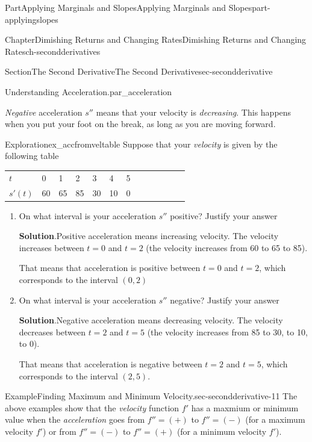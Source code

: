 \documentclass{tufte-book}
\newcommand{\blocktitlefont}{\relax}
\newcommand{\tabularfont}{\relax}
\numberwithin{equation}{chapter}
\newcommand{\hrulemedium}{\noalign{\hrule height 0.07em}}
\begin{document}
\begin{partptx}{Part}{Applying Marginals and Slopes}{}{Applying Marginals and Slopes}{}{}{part-applyingslopes}
\begin{chapterptx}{Chapter}{Dimishing Returns and Changing Rates}{}{Dimishing Returns and Changing Rates}{}{}{ch-secondderivatives}
\begin{sectionptx}{Section}{The Second Derivative}{}{The Second Derivative}{}{}{sec-secondderivative}
\begin{paragraphs}{Understanding Acceleration.}{par_acceleration}
\par
\emph{Negative} acceleration \(s''\) means that your velocity is \emph{decreasing}.  This happens when you put your foot on the break, as long as you are moving forward.%
\end{paragraphs}%
\begin{exploration}{Exploration}{}{ex_accfromveltable}%
Suppose that your \emph{velocity} is given by the following table \begin{center}%
{\tabularfont%
\begin{tabular}{lBlBlBlBlBlBl}
\(t\)&0&1&2&3&4&5\tabularnewline\hrulemedium
\(s'(t)\)&60&65&85&30&10&0
\end{tabular}
}%
\end{center}%
%
\begin{enumerate}[font=\bfseries,label=(\alph*),ref=\alph*]%
\item{}On what interval is your acceleration \(s''\) positive? Justify your answer%
\par\smallskip%
\noindent\textbf{\blocktitlefont Solution}.\hypertarget{ex_accfromveltable-2-2}{}\quad{}Positive acceleration means increasing velocity. The velocity increases between \(t=0\) and \(t=2\) (the velocity increases from 60 to 65 to 85).%
\par
That means that acceleration is positive between \(t=0\) and \(t=2\), which corresponds to the interval \((0,2)\)%
\item{}On what interval is your acceleration \(s''\) negative? Justify your answer%
\par\smallskip%
\noindent\textbf{\blocktitlefont Solution}.\hypertarget{ex_accfromveltable-3-2}{}\quad{}Negative acceleration means decreasing velocity. The velocity decreases between \(t=2\) and \(t=5\) (the velocity increases from 85 to 30, to 10, to 0).%
\par
That means that acceleration is negative between \(t=2\) and \(t=5\), which corresponds to the interval \((2,5)\).%
\end{enumerate}%
\end{exploration}%
\begin{example}{Example}{Finding Maximum and Minimum Velocity.}{sec-secondderivative-11}%
The above examples show that the \emph{velocity} function \(f'\) has a maxmium or minimum value when the \emph{acceleration} goes from \(f''=(+)\) to \(f''=(-)\) (for a maximum velocity \(f'\)) or from \(f''=(-)\) to \(f''=(+)\) (for a minimum velocity \(f'\)).%
\end{example}
\end{sectionptx}

\end{chapterptx}
\end{partptx}
\end{document}
